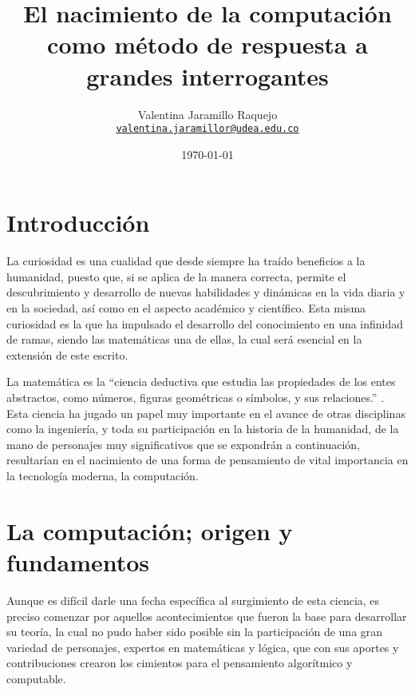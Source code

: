 \documentclass[11pt]{article}
\title{El nacimiento de la computación como método de respuesta a grandes interrogantes}
\author{Valentina Jaramillo Raquejo\\%
    \href{mailto:valentina.jaramillor@udea.edu.co}{\texttt{valentina.jaramillor@udea.edu.co}} %
    }
\date{\today}
\begin{document}
{
\maketitle


\section{Introducción}

La curiosidad es una cualidad que desde siempre ha traído beneficios a la humanidad, puesto que, si se aplica de la manera correcta, permite el descubrimiento y desarrollo de nuevas habilidades y dinámicas en la vida diaria y en la sociedad, así como en el aspecto académico y científico. Esta misma curiosidad es la que ha impulsado el desarrollo del conocimiento en una infinidad de ramas, siendo las matemáticas una de ellas, la cual será esencial en la extensión de este escrito.
\newline

La matemática es la “ciencia deductiva que estudia las propiedades de los entes abstractos, como números, figuras geométricas o símbolos, y sus relaciones.” \citep{RAE}. Esta ciencia ha jugado un papel muy importante en el avance de otras disciplinas como la ingeniería,  y toda su participación en la historia de la humanidad, de la mano de personajes muy significativos que se expondrán a continuación, resultarían en el nacimiento de una forma de pensamiento de vital importancia en la tecnología moderna, la computación.


\section{La computación; origen y fundamentos}

Aunque es difícil darle una fecha específica al surgimiento de esta ciencia, es preciso comenzar por aquellos acontecimientos que fueron la base para desarrollar su teoría, la cual no pudo haber sido posible sin la participación de una gran variedad de personajes, expertos en matemáticas y lógica, que con sus aportes y contribuciones crearon los cimientos para el pensamiento algorítmico y computable.
\newline

}
\end{document}
